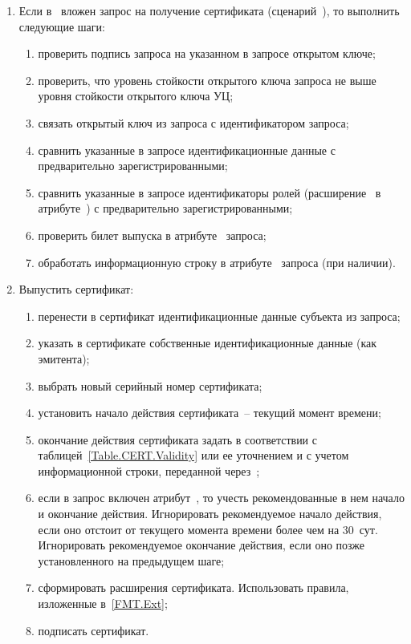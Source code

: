 \begin{enumerate}
\item
Если в~ вложен запрос на получение сертификата
(сценарий~), то выполнить следующие шаги:
\begin{enumerate}
\item
проверить подпись запроса на указанном в запросе открытом ключе;
\item
проверить, что уровень стойкости открытого ключа запроса не выше уровня стойкости 
открытого ключа УЦ;
\item
связать открытый ключ из запроса с идентификатором запроса;
\item
сравнить указанные в запросе идентификационные данные с предварительно
зарегистрированными;
\item
сравнить указанные в запросе идентификаторы ролей 
(расширение~ в 
атрибуте~) с предварительно зарегистрированными; 
\item
проверить билет выпуска в атрибуте~ запроса;
\item
обработать информационную строку в атрибуте~ запроса
(при наличии).
\end{enumerate}

\item
Выпустить сертификат:
\begin{enumerate}
\item
перенести в сертификат идентификационные данные субъекта из запроса;
\item
указать в сертификате собственные идентификационные данные (как эмитента);
\item
выбрать новый серийный номер сертификата;
\item
установить начало действия сертификата~-- текущий момент времени;
\item
окончание действия сертификата задать в соответствии с
таблицей~\ref{Table.CERT.Validity} или ее уточнением и с учетом информационной
строки, переданной через~;
\item
если в запрос включен атрибут~, то учесть
рекомендованные в нем начало и окончание действия. Игнорировать рекомендуемое
начало действия, если оно отстоит от текущего момента времени более чем на
$30$~сут. Игнорировать рекомендуемое окончание действия, если оно позже
установленного на предыдущем шаге;
\item
сформировать расширения сертификата. Использовать правила, изложенные
в~\ref{FMT.Ext};
\item
подписать сертификат.
\end{enumerate}
\end{enumerate}

